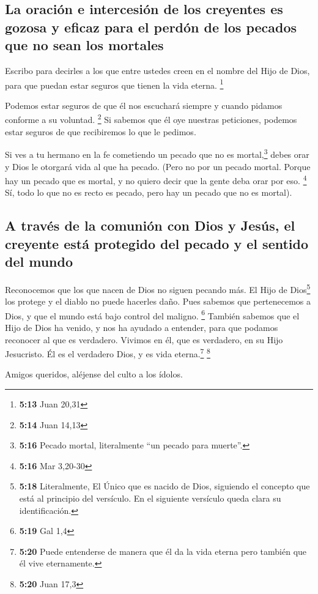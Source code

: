 \hypertarget{la-oraciuxf3n-e-intercesiuxf3n-de-los-creyentes-es-gozosa-y-eficaz-para-el-perduxf3n-de-los-pecados-que-no-sean-los-mortales}{%
\subsection{La oración e intercesión de los creyentes es gozosa y eficaz
para el perdón de los pecados que no sean los
mortales}\label{la-oraciuxf3n-e-intercesiuxf3n-de-los-creyentes-es-gozosa-y-eficaz-para-el-perduxf3n-de-los-pecados-que-no-sean-los-mortales}}

 Escribo para decirles a los que entre ustedes creen en
el nombre del Hijo de Dios, para que puedan estar seguros que tienen la
vida eterna. \footnote{\textbf{5:13} Juan 20,31}

 Podemos estar seguros de que él nos escuchará siempre y
cuando pidamos conforme a su voluntad. \footnote{\textbf{5:14} Juan
  14,13}  Si sabemos que él oye nuestras peticiones,
podemos estar seguros de que recibiremos lo que le pedimos.

 Si ves a tu hermano en la fe cometiendo un pecado que no
es mortal,\footnote{\textbf{5:16} Pecado mortal, literalmente ``un
  pecado para muerte''.} debes orar y Dios le otorgará vida al que ha
pecado. (Pero no por un pecado mortal. Porque hay un pecado que es
mortal, y no quiero decir que la gente deba orar por eso. \footnote{\textbf{5:16}
  Mar 3,20-30}  Sí, todo lo que no es recto es pecado,
pero hay un pecado que no es mortal).

\hypertarget{a-travuxe9s-de-la-comuniuxf3n-con-dios-y-jesuxfas-el-creyente-estuxe1-protegido-del-pecado-y-el-sentido-del-mundo}{%
\subsection{A través de la comunión con Dios y Jesús, el creyente está
protegido del pecado y el sentido del
mundo}\label{a-travuxe9s-de-la-comuniuxf3n-con-dios-y-jesuxfas-el-creyente-estuxe1-protegido-del-pecado-y-el-sentido-del-mundo}}

 Reconocemos que los que nacen de Dios no siguen pecando
más. El Hijo de Dios\footnote{\textbf{5:18} Literalmente, El Único que
  es nacido de Dios, siguiendo el concepto que está al principio del
  versículo. En el siguiente versículo queda clara su identificación.}
los protege y el diablo no puede hacerles daño.  Pues
sabemos que pertenecemos a Dios, y que el mundo está bajo control del
maligno. \footnote{\textbf{5:19} Gal 1,4}  También
sabemos que el Hijo de Dios ha venido, y nos ha ayudado a entender, para
que podamos reconocer al que es verdadero. Vivimos en él, que es
verdadero, en su Hijo Jesucristo. Él es el verdadero Dios, y es vida
eterna.\footnote{\textbf{5:20} Puede entenderse de manera que él da la
  vida eterna pero también que él vive eternamente.} \footnote{\textbf{5:20}
  Juan 17,3}

 Amigos queridos, aléjense del culto a los ídolos.

